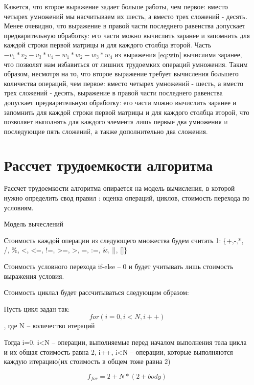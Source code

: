 Кажется, что второе выражение задает больше работы, чем первое: вместо четырех умножений мы насчитываем их шесть, а вместо трех сложений - десять. Менее очевидно, что выражение в правой части последнего равенства допускает предварительную обработку: его части можно вычислить заранее и запомнить для каждой строки первой матрицы и для каждого столбца второй. 
Часть $- v_1 * v_2 - v_3 * v_4 - w_1 * w_2 - w_3 * w_4$ из выражения \ref{eq:win} вычислима заранее, что позволят нам избавиться от лишних трудоемких операций умножения.
 Таким образом, несмотря на то, что второе выражение требует вычисления большего количества операций, чем первое: вместо четырех умножений - шесть, а вместо трех сложений - десять, выражение в правой части последнего равенства допускает предварительную обработку: его части можно вычислить заранее и запомнить для каждой строки первой матрицы и для каждого столбца второй, что позволяет выполнять для каждого элемента лишь первые два умножения и последующие пять сложений, а также дополнительно два сложения.


\section{ Рассчет трудоемкости алгоритма}

Рассчет трудоемкости алгоритма опирается на модель вычисления, в которой нужно определить свод правил : оценка операций, циклов, стоимость перехода по условиям.

Модель вычеслений

Стоимость каждой операции из следующего множества будем считать 1:
\{+,-,*, /, \%, <, <=, !=, >=, >, =, :=, \&, ||, []\}

Стоимость условного перехода if-else -- 0 и будет учитывать лишь стоимость выражения условия.

Стоимость циклал будет рассчитываться следующим образом:

Пусть цикл задан так:
\begin{equation}
    for(i=0, i<N, i++)
\end{equation}
, где N -- количество итераций

Тогда
i=0, i<N -- операции, выполняемые перед началом выполнения тела цикла и их общая стоимость равна 2, 
i++, i<N -- операции, которые выполняются каждую итерацию(их стоимость в общем тоже равна 2)

\begin{equation}
    f_{for} = 2 + N*(2 + body)
\end{equation}
